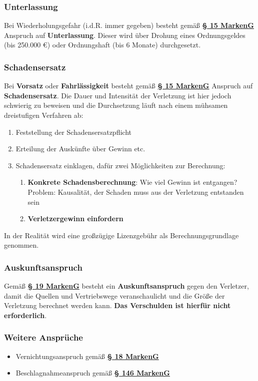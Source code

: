 \documentclass[12pt,A4]{extarticle}
\newcommand{\highlight}[1]{\textcolor{highlightColor}{\textbf{#1}}}
\newcommand{\markenG}[2][]{\textbf{\textcolor{markenGesetzLink}{\href{https://www.gesetze-im-internet.de/markeng/__#2.html}{§ #2 \ifthenelse{\equal{#1}{}}{}{#1 }MarkenG}}}}
\begin{document}
\subsubsection{Unterlassung}
Bei Wiederholungsgefahr (i.d.R. immer gegeben) besteht gemäß \markenG[Abs. 5]{15} Anspruch auf \highlight{Unterlassung}. Dieser wird über Drohung eines Ordnungsgeldes (bis 250.000 €) oder Ordnungshaft (bis 6 Monate) durchgesetzt.

\subsubsection{Schadensersatz}
Bei \textbf{Vorsatz} oder \textbf{Fahrlässigkeit} besteht gemäß \markenG[Abs. 6]{15} Anspruch auf \highlight{Schadensersatz}. Die Dauer und Intensität der Verletzung ist hier jedoch schwierig zu beweisen und die Durchsetzung läuft nach einem mühsamen dreistufigen Verfahren ab:

\begin{enumerate}
  \item{Feststellung der Schadensersatzpflicht}
  \item{Erteilung der Auskünfte über Gewinn etc.}
  \item{Schadensersatz einklagen, dafür zwei Möglichkeiten zur Berechnung:
              \begin{enumerate}
                \item{\textbf{Konkrete Schadensberechnung}: Wie viel Gewinn ist entgangen? Problem: Kausalität, der Schaden muss aus der Verletzung entstanden sein}
                \item{\textbf{Verletzergewinn einfordern}}
              \end{enumerate}
        }
\end{enumerate}
In der Realität wird eine großzügige Lizenzgebühr als Berechnungsgrundlage genommen.

\subsubsection{Auskunftsanspruch}
Gemäß \markenG{19} besteht ein \textbf{Auskunftsanspruch} gegen den Verletzer, damit die Quellen und Vertriebswege veranschaulicht und die Größe der Verletzung berechnet werden kann. \textbf{Das Verschulden ist hierfür nicht erforderlich}.

\subsubsection{Weitere Ansprüche}
\begin{itemize}
  \item{Vernichtungsanspruch gemäß \markenG{18}}
  \item{Beschlagnahmeanspruch gemäß \markenG{146}}
\end{itemize}
\end{document}
